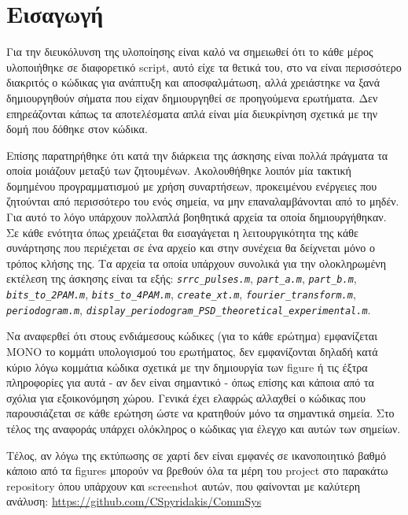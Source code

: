 \documentclass[11pt]{article}
\begin{document}
    \section*{Εισαγωγή}
    Για την διευκόλυνση της υλοποίησης είναι καλό να σημειωθεί ότι το κάθε μέρος υλοποιήθηκε σε διαφορετικό script, αυτό είχε τα θετικά του, στο να είναι περισσότερο διακριτός ο κώδικας για ανάπτυξη και αποσφαλμάτωση, αλλά χρειάστηκε να ξανά δημιουργηθούν σήματα που είχαν δημιουργηθεί σε προηγούμενα ερωτήματα. Δεν επηρεάζονται κάπως τα αποτελέσματα απλά είναι μία διευκρίνηση σχετικά με την δομή που δόθηκε στον κώδικα. 
    \par \noindent
    Επίσης παρατηρήθηκε ότι κατά την διάρκεια της άσκησης είναι πολλά πράγματα τα οποία μοιάζουν μεταξύ των ζητουμένων. Ακολουθήθηκε λοιπόν μία τακτική δομημένου προγραμματισμού με χρήση συναρτήσεων, προκειμένου ενέργειες που ζητούνται από περισσότερο του ενός σημεία, να μην επαναλαμβάνονται από το μηδέν. Για αυτό το λόγο υπάρχουν πολλαπλά βοηθητικά αρχεία τα οποία δημιουργήθηκαν. Σε κάθε ενότητα όπως χρειάζεται θα εισαγάγεται η λειτουργικότητα της κάθε συνάρτησης που περιέχεται σε ένα αρχείο και στην συνέχεια θα δείχνεται μόνο ο τρόπος κλήσης της. Τα αρχεία τα οποία υπάρχουν συνολικά για την ολοκληρωμένη εκτέλεση της άσκησης είναι τα εξής: \emph{\texttt{srrc\_pulses.m}}, \emph{\texttt{part\_a.m}}, \emph{\texttt{part\_b.m}}, \emph{\texttt{bits\_to\_2PAM.m}}, \emph{\texttt{bits\_to\_4PAM.m}}, \emph{\texttt{create\_xt.m}}, \emph{\texttt{fourier\_transform.m}}, \emph{\texttt{periodogram.m}}, \emph{\texttt{display\_periodogram\_PSD\_theoretical\_experimental.m}}.
    \par \noindent
    Να αναφερθεί ότι στους ενδιάμεσους κώδικες (για το κάθε ερώτημα) εμφανίζεται ΜΟΝΟ το κομμάτι υπολογισμού του ερωτήματος, δεν εμφανίζονται δηλαδή κατά κύριο λόγω κομμάτια κώδικα σχετικά με την δημιουργία των figure ή τις έξτρα πληροφορίες για αυτά - αν δεν είναι σημαντικό - όπως επίσης και κάποια από τα σχόλια για εξοικονόμηση χώρου. Γενικά έχει ελαφρώς αλλαχθεί ο κώδικας που παρουσιάζεται σε κάθε ερώτηση ώστε να κρατηθούν μόνο τα σημαντικά σημεία. Στο τέλος της αναφοράς υπάρχει ολόκληρος ο κώδικας για έλεγχο και αυτών των σημείων.
    \par \noindent
    Τέλος, αν λόγω της εκτύπωσης σε χαρτί δεν είναι εμφανές σε ικανοποιητικό βαθμό κάποιο από τα figures μπορούν να βρεθούν όλα τα μέρη του project στο παρακάτω repository όπου υπάρχουν και screenshot αυτών, που φαίνονται με καλύτερη ανάλυση: \url{https://github.com/CSpyridakis/CommSys}
\end{document}
